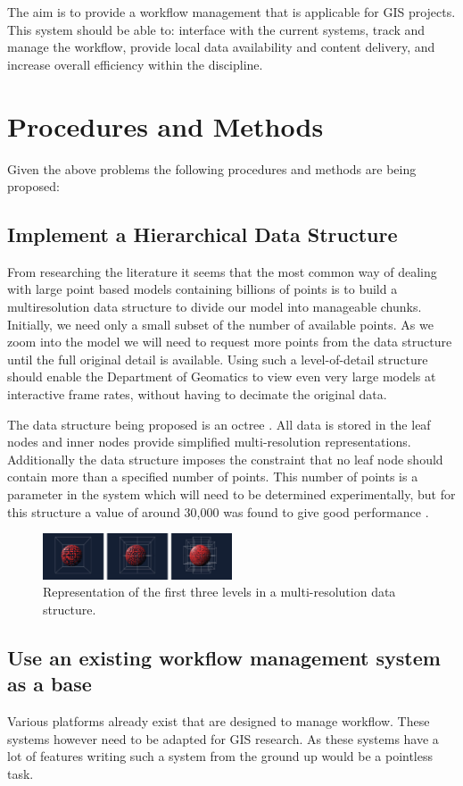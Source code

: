 \documentclass[12pt,a4paper]{article}
\begin{document}
The aim is to provide a workflow management that is applicable for GIS projects.
This system should be able to: interface with the current systems, track and
manage the workflow, provide local data availability and content delivery, and
increase overall efficiency within the discipline.

\section{Procedures and Methods}
Given the above problems the following procedures and methods are being proposed:
\subsection{Implement a Hierarchical Data Structure}
From researching the literature it seems that the most common way of dealing
with large point based models containing billions of points is to build a
multiresolution data structure to divide our model into manageable chunks.
Initially, we need only a small subset of the number of available points.
As we zoom into the model we will need to request more points from the
data structure until the full original detail is available. Using such a
level-of-detail structure should enable the Department of Geomatics to
view even very large models at interactive frame rates, without having
to decimate the original data.

The data structure being proposed is an octree \cite{interactivepointclouds}. All
data is stored in the leaf nodes and inner nodes provide simplified multi-resolution
representations. Additionally the data structure imposes the constraint that no leaf
node should contain more than a specified number of points. This number of points is
a parameter in the system which will need to be determined experimentally, but for
this structure a value of around 30,000 was found to give good performance
\cite{interactivepointclouds}.
\begin{figure}[h!]
\centering
    \includegraphics[width=0.5\textwidth]{oct.png}
    \caption{Representation of the first three levels in a multi-resolution data structure.}
\end{figure}

\subsection{Use an existing workflow management system as a base}
Various platforms already exist that are designed to manage workflow. These
systems however need to be adapted for GIS research. As these systems have a lot of
features writing such a system from the ground up would be a pointless task.
\end{document}
